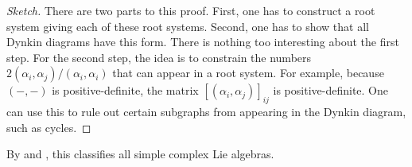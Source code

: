 \documentclass{article}
\begin{document}
\begin{theorem}

\end{theorem}
\begin{proof}[Sketch]
	There are two parts to this proof. First, one has to construct a root system giving each of these root systems. Second, one has to show that all Dynkin diagrams have this form. There is nothing too interesting about the first step. For the second step, the idea is to constrain the numbers $2(\alpha_i,\alpha_j)/(\alpha_i,\alpha_i)$ that can appear in a root system. For example, because $(-,-)$ is positive-definite, the matrix $[(\alpha_i,\alpha_j)]_{ij}$ is positive-definite. One can use this to rule out certain subgraphs from appearing in the Dynkin diagram, such as cycles. 
\end{proof}
\begin{remark}
	By  and , this classifies all simple complex Lie algebras.
\end{remark}
\end{document}
